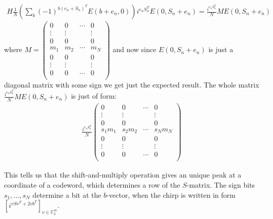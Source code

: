 \documentclass{article}
\begin{document}
	\begin{align*}
		H \frac{1}{N} \left(\sum_{b} (-1)^{b(e_n+S_n)^T} E(b+e_n, 0) \right) i^{e_nS_n^T}E(0, S_n + e_n) = \frac{i^{e_nS_n^T}}{N}ME(0, S_n + e_n)
	\end{align*}
	where $M = \begin{pmatrix} 0 & 0 & \cdots & 0 \\
		\vdots & \vdots &  & \vdots \\
		0 & 0 &  & 0 \\
		m_1 & m_2 & \cdots & m_N \\
		0 & 0 & & 0 \\
		\vdots & \vdots &  & \vdots \\
		0 & 0 & \cdots & 0 \\
	\end{pmatrix}$ and now since $E(0, S_n + e_n)$ is just a diagonal matrix with some sign we get just the expected result. The whole matrix $\frac{i^{e_nS_n^T}}{N}ME(0, S_n + e_n)$ is just of form:
	\begin{align*}
		\frac{i^{e_nS_n^T}}{N} \begin{pmatrix} 0 & 0 & \cdots & 0 \\
			\vdots & \vdots &  & \vdots \\
			0 & 0 &  & 0 \\
			s_1m_1 & s_2m_2 & \cdots & s_Nm_N \\
			0 & 0 & & 0 \\
			\vdots & \vdots &  & \vdots \\
			0 & 0 & \cdots & 0 \\
		\end{pmatrix}
	\end{align*}
	
	This tells us that the shift-and-multiply operation gives an unique peak at a coordinate of a codeword, which determines a row of the $S$-matrix. The sign bits $s_1,...,s_N$ determine a bit at the $b$-vector, when the chirp is written in form $\left[i^{vSv^T + 2vb^T}\right]_{v \in \mathbb{F}^m_2}$.
	
\end{document}
